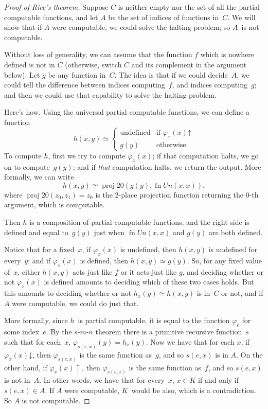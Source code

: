 \documentclass[10pt,a4paper]{article}
\theoremstyle{plain}
\theoremstyle{definition}
\theoremstyle{remark}
\providecommand{\cfind}[1]{\varphi_{#1}}
\providecommand{\fdefined}{\mathord{\downarrow}}
\providecommand{\Proj}{\operatorname{proj}}
\providecommand{\fundefined}{\mathord{\uparrow}}
\providecommand{\fn}{\operatorname{fn}}
\begin{document}
\begin{proof}[Proof of Rice's theorem]
Suppose $C$ is neither empty nor the set of all the partial
computable functions, and let $A$ be the set of indices of functions
in~$C$. We will show that if $A$ were computable, we could solve the
halting problem; so $A$~is not computable.

Without loss of generality, we can assume that the function $f$ which
is nowhere defined is not in $C$ (otherwise, switch $C$ and its
complement in the argument below). Let $g$ be any function in~$C$. The
idea is that if we could decide~$A$, we could tell the difference
between indices computing~$f$, and indices computing~$g$; and then we
could use that capability to solve the halting problem.

Here's how. Using the universal partial computable functions, we can
define a function
\[
h(x,y) \simeq
\begin{cases}
\text{undefined} & \text{if $\cfind{x}(x) \fundefined$} \\
g(y) & \text{otherwise.}
\end{cases}
\]
To compute $h$, first we try to compute $\cfind{x}(x)$; if that
computation halts, we go on to compute~$g(y)$; and if {\em that}
computation halts, we return the output. More formally, we can write
\[
h(x,y) \simeq \Proj{2}{0}(g(y),\fn{Un}(x,x)).
\]
where $\Proj{2}{0}(z_0, z_1) = z_0$ is the $2$-place projection
function returning the $0$-th argument, which is computable.

Then $h$ is a composition of partial computable functions, and the right
side is defined and equal to~$g(y)$ just when $\fn{Un}(x,x)$ and
$g(y)$ are both defined.

Notice that for a fixed~$x$, if $\cfind{x}(x)$ is undefined, then
$h(x,y)$ is undefined for every~$y$; and if $\cfind{x}(x)$ is defined,
then $h(x,y) \simeq g(y)$. So, for any fixed value of~$x$, either
$h(x,y)$ acts just like $f$ or it acts just like $g$, and deciding
whether or not $\cfind{x}(x)$ is defined amounts to deciding which of
these two cases holds. But this amounts to deciding whether or not
$h_x(y) \simeq h(x,y)$ is in~$C$ or not, and if $A$ were computable,
we could do just that.

More formally, since $h$~is partial computable, it is equal to the
function $\cfind{e}$ for some index~$e$. By the $s$-$m$-$n$ theorem
there is a primitive recursive function~$s$ such that for each~$x$,
$\cfind{s(e,x)}(y) = h_x(y)$. Now we have that for each $x$, if
$\cfind{x}(x) \fdefined$, then $\cfind{s(e,x)}$ is the same function
as~$g$, and so $s(e,x)$ is in $A$. On the other hand, if $\cfind{x}(x)
\uparrow$, then $\cfind{s(e,x)}$ is the same function as~$f$, and so
$s(e,x)$ is not in~$A$. In other words, we have that for every~$x$, $x
\in K$ if and only if $s(e,x) \in A$. If $A$ were computable,
$K$~would be also, which is a contradiction. So $A$ is not computable.
\end{proof}
\end{document}
